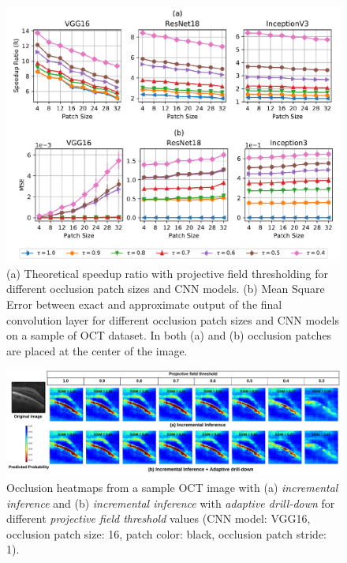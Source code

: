 \begin{figure}[t]
\includegraphics[width=\columnwidth]{images/proj_thresholding}
\caption{(a) Theoretical speedup ratio with projective field thresholding for different occlusion patch sizes and CNN models. (b) Mean Square Error between exact and approximate output of the final convolution layer for different occlusion patch sizes and CNN models on a sample of OCT dataset. In both (a) and (b) occlusion patches are placed at the center of the image.}
\label{fig:th_redundancy_ratio}
\end{figure}

\begin{figure}[t]
\includegraphics[width=\textwidth]{images/visual_examples_1}
\caption{Occlusion heatmaps from a sample OCT image with (a) \textit{incremental inference} and (b) \textit{incremental inference} with \textit{adaptive drill-down} for different \textit{projective field threshold} values (CNN model: VGG16, occlusion patch size: 16, patch color: black, occlusion patch stride: 1).}
\label{fig:visual_examples_1}
\end{figure}


